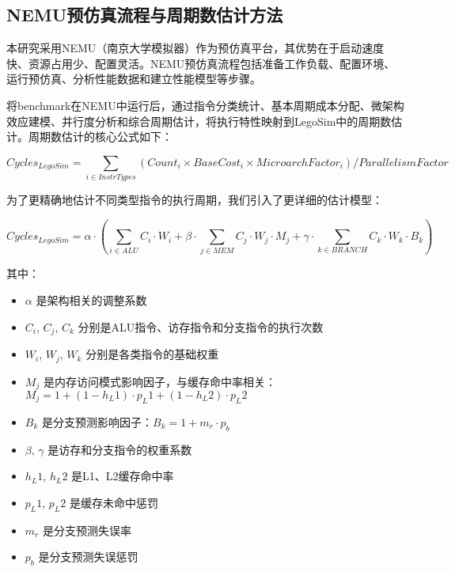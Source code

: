 \documentclass[bachelor]{thesis-uestc}
\begin{document}
\subsection{NEMU预仿真流程与周期数估计方法}

本研究采用NEMU（南京大学模拟器）作为预仿真平台，其优势在于启动速度快、资源占用少、配置灵活。NEMU预仿真流程包括准备工作负载、配置环境、运行预仿真、分析性能数据和建立性能模型等步骤。

将benchmark在NEMU中运行后，通过指令分类统计、基本周期成本分配、微架构效应建模、并行度分析和综合周期估计，将执行特性映射到LegoSim中的周期数估计。周期数估计的核心公式如下：

\begin{equation}
Cycles_{LegoSim} = \sum_{i \in InstrTypes} (Count_i \times BaseCost_i \times MicroarchFactor_i) / ParallelismFactor
\end{equation}

为了更精确地估计不同类型指令的执行周期，我们引入了更详细的估计模型：

\begin{equation}
Cycles_{LegoSim} = \alpha \cdot \left( \sum_{i \in ALU} C_i \cdot W_i + \beta \cdot \sum_{j \in MEM} C_j \cdot W_j \cdot M_j + \gamma \cdot \sum_{k \in BRANCH} C_k \cdot W_k \cdot B_k \right)
\end{equation}

其中：
\begin{itemize}
    \item $\alpha$ 是架构相关的调整系数
    \item $C_i$, $C_j$, $C_k$ 分别是ALU指令、访存指令和分支指令的执行次数
    \item $W_i$, $W_j$, $W_k$ 分别是各类指令的基础权重
    \item $M_j$ 是内存访问模式影响因子，与缓存命中率相关：
    $M_j = 1 + (1-h_L1) \cdot p_L1 + (1-h_L2) \cdot p_L2$
    \item $B_k$ 是分支预测影响因子：$B_k = 1 + m_r \cdot p_b$
    \item $\beta$, $\gamma$ 是访存和分支指令的权重系数
    \item $h_L1$, $h_L2$ 是L1、L2缓存命中率
    \item $p_L1$, $p_L2$ 是缓存未命中惩罚
    \item $m_r$ 是分支预测失误率
    \item $p_b$ 是分支预测失误惩罚
\end{itemize}
\end{document}
